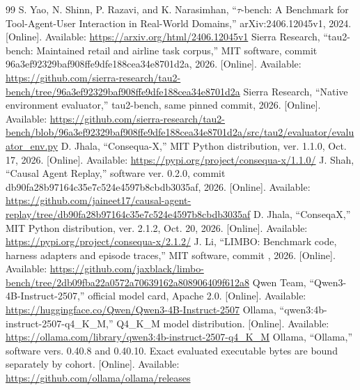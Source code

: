 \documentclass[conference]{IEEEtran}
\begin{document}
\begin{thebibliography}{99}
S. Yao, N. Shinn, P. Razavi, and K. Narasimhan, ``$\tau$-bench: A Benchmark for Tool-Agent-User Interaction in Real-World Domains,'' arXiv:2406.12045v1, 2024. [Online]. Available: \url{https://arxiv.org/html/2406.12045v1}
Sierra Research, ``tau2-bench: Maintained retail and airline task corpus,''
MIT software, commit 96a3ef92329baf908ffe9dfe188cea34e8701d2a, 2026.
[Online]. Available:
\url{https://github.com/sierra-research/tau2-bench/tree/96a3ef92329baf908ffe9dfe188cea34e8701d2a}
Sierra Research, ``Native environment evaluator,'' tau2-bench, same pinned
commit, 2026. [Online]. Available:
\url{https://github.com/sierra-research/tau2-bench/blob/96a3ef92329baf908ffe9dfe188cea34e8701d2a/src/tau2/evaluator/evaluator_env.py}
 D. Jhala, ``Consequa-X,'' MIT Python distribution,
ver. 1.1.0, Oct. 17, 2026. [Online]. Available:
\url{https://pypi.org/project/consequa-x/1.1.0/}
J. Shah, ``Causal Agent Replay,'' software ver. 0.2.0, commit
db90fa28b97164c35e7c524e4597b8cbdb3035af, 2026. [Online]. Available:
\url{https://github.com/jaineet17/causal-agent-replay/tree/db90fa28b97164c35e7c524e4597b8cbdb3035af}
 D. Jhala, ``ConseqaX,'' MIT Python distribution,
ver. 2.1.2, Oct. 20, 2026. [Online]. Available:
\url{https://pypi.org/project/consequa-x/2.1.2/}
J. Li, ``LIMBO: Benchmark code, harness adapters and episode traces,'' MIT software, commit , 2026. [Online]. Available: \url{https://github.com/jaxblack/limbo-bench/tree/2db09fba22a0572a70639162a808906409f612a8}
Qwen Team, ``Qwen3-4B-Instruct-2507,'' official model card, Apache 2.0. [Online]. Available: \url{https://huggingface.co/Qwen/Qwen3-4B-Instruct-2507}
Ollama, ``qwen3:4b-instruct-2507-q4\_K\_M,'' Q4\_K\_M model distribution. [Online]. Available: \url{https://ollama.com/library/qwen3:4b-instruct-2507-q4_K_M}
Ollama, ``Ollama,'' software vers. 0.40.8 and 0.40.10. Exact evaluated executable bytes are bound separately by cohort. [Online]. Available: \url{https://github.com/ollama/ollama/releases}
\end{thebibliography}
\end{document}

